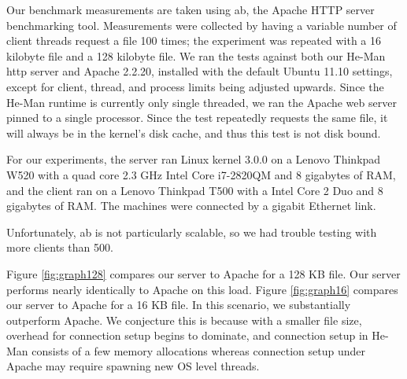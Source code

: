 \documentclass[preprint,11pt]{sigplanconf}
\begin{document}
Our benchmark measurements are taken using ab, the Apache HTTP server
benchmarking tool. \cite{ApacheAB} Measurements were collected by
having a variable number of client threads request a file 100 times;
the experiment was repeated with a 16 kilobyte file and a 128 kilobyte
file. We ran the tests against both our He-Man http server and Apache
2.2.20, installed with the default Ubuntu 11.10 settings, except for
client, thread, and process limits being adjusted upwards. Since the
He-Man runtime is currently only single threaded, we ran the Apache
web server pinned to a single processor. Since the test repeatedly
requests the same file, it will always be in the kernel's disk cache,
and thus this test is not disk bound.

For our experiments, the server ran Linux kernel 3.0.0 on a Lenovo
Thinkpad W520 with a quad core 2.3 GHz Intel Core i7-2820QM and 8
gigabytes of RAM, and the client ran on a Lenovo Thinkpad T500 with a
Intel Core 2 Duo and 8 gigabytes of RAM.  %
The machines were connected by a gigabit Ethernet link.

Unfortunately, ab is not particularly scalable, so we had trouble
testing with more clients than 500.

Figure \ref{fig:graph128} compares our server to Apache for a 128 KB
file. Our server performs nearly identically to Apache on this load.
Figure \ref{fig:graph16} compares our server to Apache for a 16 KB
file. In this scenario, we substantially outperform Apache. We
conjecture this is because with a smaller file size, overhead for
connection setup begins to dominate, and connection setup in He-Man
consists of a few memory allocations whereas connection setup under
Apache may require spawning new OS level threads.
\end{document}
